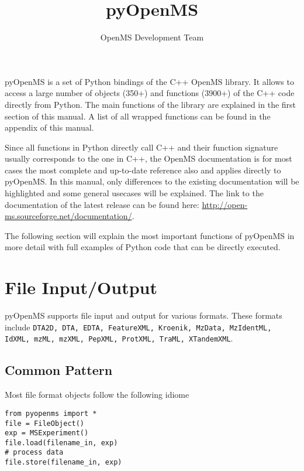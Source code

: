 \documentclass[10pt]{article}
\title{pyOpenMS }
\author{OpenMS Development Team}
\date{}
\begin{document}
  \maketitle

  pyOpenMS is a set of Python bindings of the C++ OpenMS library. It allows to
  access a large number of objects (350+) and functions (3900+) of the C++
  code directly from Python.
  The main functions of the library are explained in the first section of this
  manual. A list of all wrapped functions can be found in the appendix of this
  manual.

  Since all functions in Python directly call C++ and their function signature
  usually corresponds to the one in C++, the OpenMS documentation is for most
  cases the most complete and up-to-date reference also and applies directly
  to pyOpenMS. In this manual, only differences to the existing documentation
  will be highlighted and some general usecases will be explained. The link to
  the documentation of the latest release can be found here:
  \url{http://open-ms.sourceforge.net/documentation/}.

  \tableofcontents

  \pagebreak

  The following section will explain the most important functions of pyOpenMS
  in more detail with full examples of Python code that can be directly
  executed.

\section{File Input/Output}

  pyOpenMS supports file input and output for various formats. These formats
  include \texttt{DTA2D, DTA, EDTA, FeatureXML, Kroenik, MzData, MzIdentML, IdXML, mzML,
  mzXML, PepXML, ProtXML, TraML, XTandemXML}.

\subsection{Common Pattern}

Most file format objects follow the following idiome

\begin{verbatim}
from pyopenms import *
file = FileObject()
exp = MSExperiment()
file.load(filename_in, exp)
# process data
file.store(filename_in, exp)
\end{verbatim}
\end{document}
